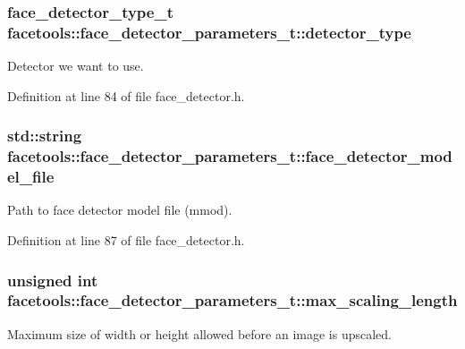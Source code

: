 \subsubsection[{\texorpdfstring{detector\+\_\+type}{detector_type}}]{\setlength{\rightskip}{0pt plus 5cm}face\+\_\+detector\+\_\+type\+\_\+t facetools\+::face\+\_\+detector\+\_\+parameters\+\_\+t\+::detector\+\_\+type}\hypertarget{structfacetools_1_1face__detector__parameters__t_a5906194c3101a3e6e16fbce2c1cf6193}{}\label{structfacetools_1_1face__detector__parameters__t_a5906194c3101a3e6e16fbce2c1cf6193}
Detector we want to use. 

Definition at line 84 of file face\+\_\+detector.\+h.

\subsubsection[{\texorpdfstring{face\+\_\+detector\+\_\+model\+\_\+file}{face_detector_model_file}}]{\setlength{\rightskip}{0pt plus 5cm}std\+::string facetools\+::face\+\_\+detector\+\_\+parameters\+\_\+t\+::face\+\_\+detector\+\_\+model\+\_\+file}\hypertarget{structfacetools_1_1face__detector__parameters__t_a7e3cf4aa0433b59c22252c4f05766308}{}\label{structfacetools_1_1face__detector__parameters__t_a7e3cf4aa0433b59c22252c4f05766308}
Path to face detector model file (mmod). 

Definition at line 87 of file face\+\_\+detector.\+h.

\subsubsection[{\texorpdfstring{max\+\_\+scaling\+\_\+length}{max_scaling_length}}]{\setlength{\rightskip}{0pt plus 5cm}unsigned int facetools\+::face\+\_\+detector\+\_\+parameters\+\_\+t\+::max\+\_\+scaling\+\_\+length}\hypertarget{structfacetools_1_1face__detector__parameters__t_a97e44f1fa2852e627eec6f40ac876802}{}\label{structfacetools_1_1face__detector__parameters__t_a97e44f1fa2852e627eec6f40ac876802}
Maximum size of width or height allowed before an image is upscaled. 

